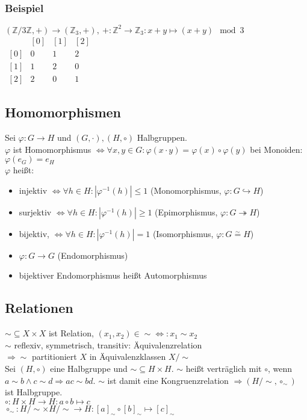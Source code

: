     \subsubsection{Beispiel}
    $(\mathds{Z}/3\mathds{Z},+)\rightarrow (\mathds{Z}_3,+),\ +:\mathds{Z}^2\rightarrow \mathds{Z}_3:x+y\mapsto (x+y)\mod 3$\\
    \begin{math}
        \begin{array}
            {c|ccc}
            & \left[0\right] & \left[1\right] & \left[2\right]\\\hline
            \left[0\right] & 0 & 1 & 2\\
            \left[1\right] & 1 & 2 & 0\\
            \left[2\right] & 2 & 0 & 1
        \end{array}
    \end{math}
    \subsection{Homomorphismen}
        Sei $\varphi: G\rightarrow H$ und $(G,\cdot),(H,\circ)$ Halbgruppen.\\
        $\varphi$ ist Homomorphismus $\Leftrightarrow\forall x,y\in G: \varphi(x\cdot y)=\varphi(x)\circ\varphi(y)$ bei Monoiden: $\varphi(e_G)=e_H$\\
        $\varphi$ heißt:
        \begin{itemize}
            \item injektiv $\Leftrightarrow\forall h\in H:|\varphi^{-1}(h)|\le 1$ (Monomorphismus, $\varphi: G \hookrightarrow H$)
            \item surjektiv $\Leftrightarrow\forall h\in H:|\varphi^{-1}(h)|\ge 1$ (Epimorphismus, $\varphi: G\twoheadrightarrow H$)
            \item bijektiv, $\Leftrightarrow\forall h\in H:|\varphi^{-1}(h)|= 1$ (Isomorphismus, $\varphi: G \overset{\sim}{=} H$)
            \item $\varphi : G\rightarrow G$ (Endomorphismus)
            \item bijektiver Endomorphismus heißt Automorphismus
        \end{itemize}
    \subsection{Relationen}
        $\sim\subseteq X\times X$ ist Relation, $(x_1,x_2)\in\sim\Leftrightarrow : x_1\sim x_2$\\
        $\sim$ reflexiv, symmetrisch, transitiv: Äquivalenzrelation\\
        \indent$\Rightarrow \sim$ partitioniert $X$ in Äquivalenzklassen $X/\sim$\\
        Sei $(H,\circ)$ eine Halbgruppe und $\sim\subseteq H\times H$. $\sim$ heißt verträglich mit $\circ$, wenn $a\sim b\wedge c\sim d\Rightarrow ac\sim bd$. $\sim$ ist damit eine Kongruenzrelation $\Rightarrow (H/\sim,\circ_\sim)$ ist Halbgruppe.\\
        $\circ: H\times H\rightarrow H: a\circ b\mapsto c$\\
        $\circ_\sim: H/\sim\times H/\sim\rightarrow H: [a]_\sim\circ [b]_\sim\mapsto [c]_\sim$
